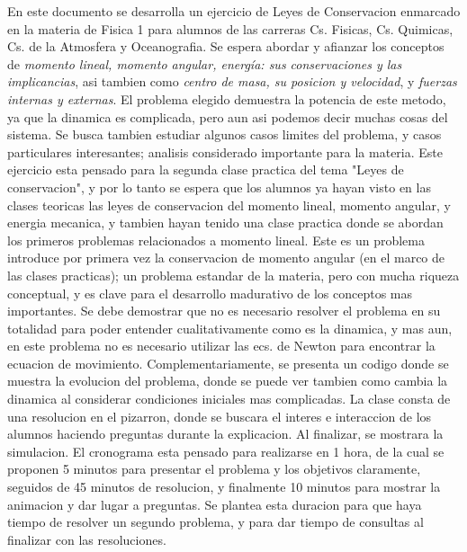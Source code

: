 \documentclass[12pt,a4paper]{article}
\begin{document}


En este documento se desarrolla un ejercicio de Leyes de Conservacion enmarcado en la materia de Fisica 1 para alumnos de las carreras Cs. Fisicas, Cs. Quimicas, Cs. de la Atmosfera y Oceanografia. Se espera abordar y afianzar los conceptos de \textit{momento lineal, momento angular, energía: sus conservaciones y las implicancias}, asi tambien como \textit{centro de masa, su posicion y velocidad}, y \textit{fuerzas internas y externas}. El problema elegido demuestra la potencia de este metodo, ya que la dinamica es complicada, pero aun asi podemos decir muchas cosas del sistema. Se busca tambien estudiar algunos casos limites del problema, y casos particulares interesantes; analisis considerado importante para la materia.  Este ejercicio esta pensado para la segunda clase practica del tema "Leyes de conservacion", y por lo tanto se espera que los alumnos ya hayan visto en las clases teoricas las leyes de conservacion del momento lineal, momento angular, y energia mecanica, y tambien hayan tenido una clase practica donde se abordan los primeros problemas relacionados a momento lineal.
Este es un problema introduce por primera vez la conservacion de momento angular (en el marco de las clases practicas); un problema estandar de la materia, pero con mucha riqueza conceptual, y es clave para el desarrollo madurativo de los conceptos mas importantes. Se debe demostrar que no es necesario resolver el problema en su totalidad para poder entender cualitativamente como es la dinamica, y mas aun, en este problema no es necesario utilizar las ecs. de Newton para encontrar la ecuacion de movimiento. Complementariamente, se presenta un codigo donde se muestra la evolucion del problema, donde se puede ver tambien como cambia la dinamica al considerar condiciones iniciales mas complicadas. 
La clase consta de una resolucion en el pizarron, donde se buscara el interes e interaccion de los alumnos haciendo preguntas durante la explicacion. Al finalizar, se mostrara la simulacion. El cronograma esta pensado para realizarse en 1 hora, de la cual se proponen 5 minutos para presentar el problema y los objetivos claramente, seguidos de 45 minutos de resolucion, y finalmente 10 minutos para mostrar la animacion y dar lugar a preguntas. Se plantea esta duracion para que haya tiempo de resolver un segundo problema, y para dar tiempo de consultas al finalizar con las resoluciones.
\end{document}
